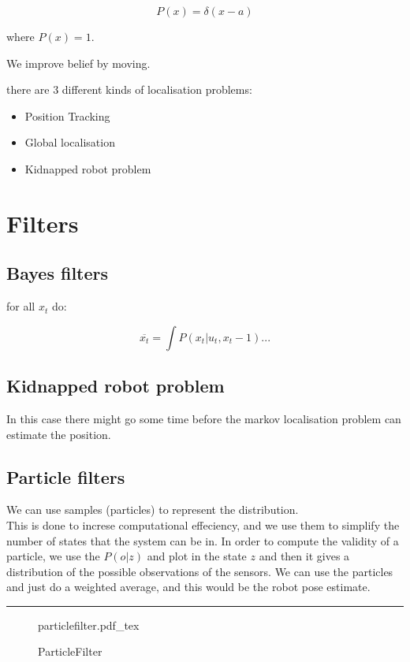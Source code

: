 \documentclass[a4paper]{article}
\newcommand{\incfig}[2][1]{%
    \def\svgwidth{#1\columnwidth}
    {#2.pdf_tex}
}
\begin{document}
\[
P(x) = \delta(x-a)
\] 

where $ P(x) = 1 $.

We improve belief by moving. 

there are 3 different kinds of localisation problems:
\begin{itemize}
	\item Position Tracking
	\item Global localisation
	\item Kidnapped robot problem
\end{itemize}

\section{Filters}
\subsection{Bayes filters}

for all $ x_t $ do:

\begin{equation}
\overline{x_t} = \int P(x_t | u_t, x_t-1)...
\end{equation}
 
\subsection{Kidnapped robot problem}
In this case there might go some time before the markov localisation problem can estimate the position.


\subsection{Particle filters}
We can use samples (particles) to represent the distribution.\\
This is done to increse computational effeciency, and we use them to simplify the number of states that the system can be in. In order to compute the validity of a particle, we use the $ P(o|z) $ and plot in the state  $ z $ and then it gives a distribution of the possible observations of the sensors. We can use the particles and just do a weighted average, and this would be the robot pose estimate. 

\vspace{5pt}
\rule{1cm}{0.4pt}
\vspace{5pt}

\begin{figure}[ht] \centering
    \incfig[1]{particlefilter}
    \caption{ParticleFilter}
    \label{fig:particlefilter}
\end{figure}
\end{document}
